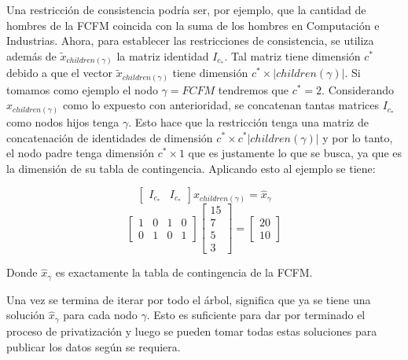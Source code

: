 \documentclass[informe]{upropuesta}
\begin{document}
Una restricción de consistencia podría ser, por ejemplo, que la cantidad de hombres de la FCFM coincida con la suma de los hombres en Computación e Industrias. Ahora, para establecer las restricciones de consistencia, se utiliza además de $\tilde{x}_{\mathit{children}(\gamma)}$ la matriz identidad $I_{c_*}$. Tal matriz tiene dimensión $c^*$ debido a que el vector $\tilde{x}_{\mathit{children}(\gamma)}$ tiene dimensión $c^* \times |\mathit{children}(\gamma)|$. Si tomamos como ejemplo el nodo $\gamma = FCFM$ tendremos que $c^* = 2$. Considerando $x_{\mathit{children}(\gamma)}$ como lo expuesto con anterioridad, se concatenan tantas matrices $I_{c_*}$ como nodos hijos tenga $\gamma$. Esto hace que la restricción tenga una matriz de concatenación de identidades de dimensión $c^* \times c^*|\mathit{children}(\gamma)|$ y por lo tanto, el nodo padre tenga dimensión $c^* \times 1$ que es justamente lo que se busca, ya que es la dimensión de su tabla de contingencia. 
Aplicando esto al ejemplo se tiene:


$$\begin{bmatrix}
    I_{c_*} & I_{c_*}
\end{bmatrix}
x_{\mathit{children}(\gamma)}
=
\hat{x}_{\gamma}$$
$$\begin{bmatrix}
    1 & 0 & 1 & 0 \\
    0 & 1 & 0 & 1
\end{bmatrix}
\begin{bmatrix}
    15 \\
    7 \\
    5 \\ 
    3
\end{bmatrix}
=
\begin{bmatrix}
    20 \\
    10
\end{bmatrix}$$

Donde $\hat{x}_{\gamma}$ es exactamente la tabla de contingencia de la FCFM.

Una vez se termina de iterar por todo el árbol, significa que ya se tiene una solución $\hat{x}_{\gamma}$ para cada nodo $\gamma$. Esto es suficiente para dar por terminado el proceso de privatización y luego se pueden tomar todas estas soluciones para publicar los datos según se requiera.

\newpage


\end{document}
